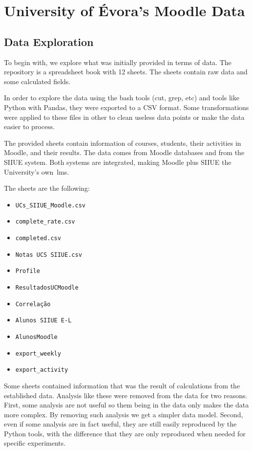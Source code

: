 \chapter{University of Évora's Moodle Data}

\section{Data Exploration}

To begin with, we explore what was initially provided in terms of data. The
repository is a spreadsheet book with 12 sheets. The sheets contain raw data
and some calculated fields.

In order to explore the data using the bash tools (cut, grep, etc) and tools
like Python with Pandas, they were exported to a CSV format. Some
transformations were applied to these files in other to clean useless data
points or make the data easier to process.

The provided sheets contain information of courses, students, their activities
in Moodle, and their results. The data comes from Moodle databases and from the
SIIUE system. Both systems are integrated, making Moodle plus SIIUE the
University's own~\gls{lms}.

The sheets are the following:

\begin{itemize}
    \item \texttt{UCs\_SIIUE\_Moodle.csv}
    \item \texttt{complete\_rate.csv}
    \item \texttt{completed.csv}
    \item \texttt{Notas UCS SIIUE.csv}
    \item \texttt{Profile}
    \item \texttt{ResultadosUCMoodle}
    \item \texttt{Correlação}
    \item \texttt{Alunos SIIUE E-L}
    \item \texttt{AlunosMoodle}
    \item \texttt{export\_weekly}
    \item \texttt{export\_activity}
\end{itemize}

Some sheets contained information that was the result of calculations from the
established data. Analysis like these were removed from the data for two
reasons. First, some analysis are not useful so them being in the data only
makes the data more complex. By removing such analysis we get a simpler data
model. Second, even if some analysis are in fact useful, they are still easily
reproduced by the Python tools, with the difference that they are only
reproduced when needed for specific experiments.

